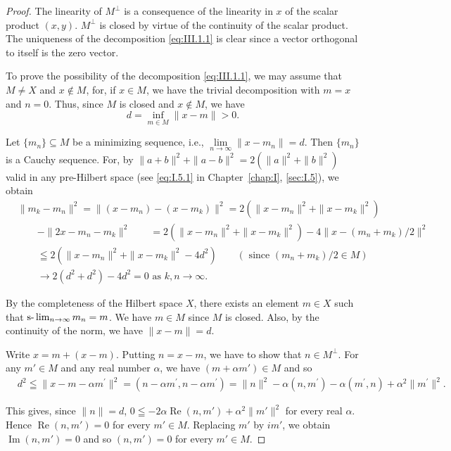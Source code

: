 \begin{proof}
 The linearity of $M^{\perp}$ is a consequence of the linearity in $x$ of the scalar product $(x, y)$. $M^{\perp}$ is closed by virtue of the continuity of the scalar product. The uniqueness of the decomposition \eqref{eq:III.1.1} is clear since a vector orthogonal to itself is the zero vector. 

To prove the possibility of the decomposition \eqref{eq:III.1.1}, we may assume that $M \neq X$ and $x \notin M$, for, if $x \in M$, we have the trivial decomposition with $m = x$ and $n = 0$. Thus, since $M$ is closed and $x \notin M$, we have 
\[
d = \inf\limits _{m \in M} \| x - m \| > 0.
\]

Let $\{m_n\} \subseteq M$ be a minimizing sequence, i.e., $\lim\limits_{n\to \infty}\|x - m_n\| = d$. Then $\{m_n\}$ is a Cauchy sequence. For, by $\|a + b\|^2 + \|a - b\|^2 = 2(\|a\|^2 + \|b\|^2)$ valid in any pre-Hilbert space (see \eqref{eq:I.5.1} in Chapter~\ref{chap:I}, \ref{sec:I.5}), we obtain 
\[
\begin{aligned}
&{\| m _{k} - m _{n} \| ^{2} = \| (x - m _{n}) - (x - m _{k}) \| ^{2} = 2 (\| x - m _{n} \| ^{2} + \| x - m _{k} \| ^{2})} \\
&{\qquad - \| 2 x - m _{n} - m _{k} \| ^{2}} {\qquad = 2 (\| x - m _{n} \| ^{2} + \| x - m _{k} \| ^{2}) - 4 \| x - (m _{n} + m _{k}) / 2 \| ^{2}} \\
&{\qquad \leqq 2 (\| x - m _{n} \| ^{2} + \| x - m _{k} \| ^{2} - 4 d ^{2})} {\qquad (\text{ since } (m _{n} + m _{k}) / 2 \in M)} \\
&{\qquad \rightarrow 2 (d ^{2} + d ^{2}) - 4 d ^{2} = 0 \text{ as } k, n \rightarrow \infty .}
\end{aligned}
\]

By the completeness of the Hilbert space $X$, there exists an element $m \in X$ such that $\text{s-}\lim\nolimits_{n \to \infty} m_n = m$. We have $m \in M$ since $M$ is closed. Also, by the continuity of the norm, we have $\|x - m\| = d$. 

Write $x = m + (x - m)$. Putting $n = x - m$, we have to show that $n \in M^{\perp}$. For any $m' \in M$ and any real number $\alpha$, we have $(m + \alpha m') \in M$ 
and so 
\[
\begin{aligned}
&d ^{2}  \leqq \| x - m - \alpha m ^{\prime} \| ^{2} = (n - \alpha m ^{\prime}, n - \alpha m ^{\prime}) = \| n \| ^{2} - \alpha (n, m ^{\prime}) - \alpha (m ^{\prime}, n) + \alpha^{2} \| m ^{\prime} \| ^{2}.
\end{aligned}
\]

This gives, since $\| n \| = d$, $0 \leqq -2\alpha \operatorname{Re}(n, m') + \alpha^2 \| m' \|^2$ for every real $\alpha$. Hence $\operatorname{Re}(n, m') = 0$ for every $m' \in M$. Replacing $m'$ by $im'$, we obtain $\operatorname{Im}(n, m') = 0$ and so $(n, m') = 0$ for every $m' \in M$. 
\end{proof}

